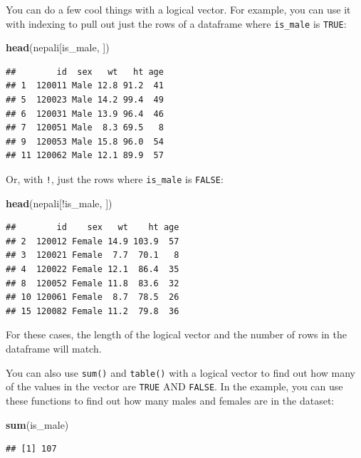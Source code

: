 \documentclass[]{book}
\makeatletter
\newenvironment{Shaded}{\begin{snugshade}}{\end{snugshade}}
\newcommand{\KeywordTok}[1]{\textcolor[rgb]{0.13,0.29,0.53}{\textbf{{#1}}}}
\newcommand{\NormalTok}[1]{{#1}}
\newenvironment{kframe}{%
\medskip{}
\setlength{\fboxsep}{.8em}
 \def\at@end@of@kframe{}%
 \ifinner\ifhmode%
  \def\at@end@of@kframe{\end{minipage}}%
  \begin{minipage}{\columnwidth}%
 \fi\fi%
 \def\FrameCommand##1{\hskip\@totalleftmargin \hskip-\fboxsep
 \colorbox{shadecolor}{##1}\hskip-\fboxsep
     \hskip-\linewidth \hskip-\@totalleftmargin \hskip\columnwidth}%
 \MakeFramed {\advance\hsize-\width
   \@totalleftmargin\z@ \linewidth\hsize
   \@setminipage}}%
 {\par\unskip\endMakeFramed%
 \at@end@of@kframe}
\renewenvironment{Shaded}{\begin{kframe}}{\end{kframe}}
\makeatother
\begin{document}
You can do a few cool things with a logical vector. For example, you can
use it with indexing to pull out just the rows of a dataframe where
\texttt{is\_male} is \texttt{TRUE}:

\begin{Shaded}
\begin{Highlighting}[]
\KeywordTok{head}\NormalTok{(nepali[is_male, ])}
\end{Highlighting}
\end{Shaded}

\begin{verbatim}
##        id  sex   wt   ht age
## 1  120011 Male 12.8 91.2  41
## 5  120023 Male 14.2 99.4  49
## 6  120031 Male 13.9 96.4  46
## 7  120051 Male  8.3 69.5   8
## 9  120053 Male 15.8 96.0  54
## 11 120062 Male 12.1 89.9  57
\end{verbatim}

Or, with \texttt{!}, just the rows where \texttt{is\_male} is
\texttt{FALSE}:

\begin{Shaded}
\begin{Highlighting}[]
\KeywordTok{head}\NormalTok{(nepali[!is_male, ])}
\end{Highlighting}
\end{Shaded}

\begin{verbatim}
##        id    sex   wt    ht age
## 2  120012 Female 14.9 103.9  57
## 3  120021 Female  7.7  70.1   8
## 4  120022 Female 12.1  86.4  35
## 8  120052 Female 11.8  83.6  32
## 10 120061 Female  8.7  78.5  26
## 15 120082 Female 11.2  79.8  36
\end{verbatim}

For these cases, the length of the logical vector and the number of rows
in the dataframe will match.

You can also use \texttt{sum()} and \texttt{table()} with a logical
vector to find out how many of the values in the vector are
\texttt{TRUE} AND \texttt{FALSE}. In the example, you can use these
functions to find out how many males and females are in the dataset:

\begin{Shaded}
\begin{Highlighting}[]
\KeywordTok{sum}\NormalTok{(is_male)}
\end{Highlighting}
\end{Shaded}

\begin{verbatim}
## [1] 107
\end{verbatim}
\end{document}
